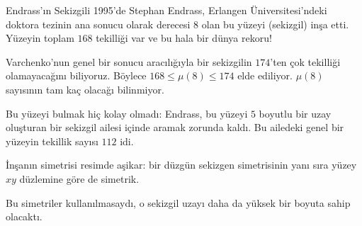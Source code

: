 \begin{surferPage}{Endrass'ın Sekizgili}
     1995'de Stephan Endrass,  Erlangen Üniversitesi'ndeki doktora tezinin ana sonucu olarak derecesi $8$ olan bu yüzeyi (sekizgil) inşa etti.
Yüzeyin toplam   $168$ tekilliği var ve bu hala bir dünya rekoru!

Varchenko'nun genel bir sonucu aracılığıyla  bir sekizgilin $174$'ten çok tekilliği olamayacağını biliyoruz. Böylece $168 \le \mu(8) \le 174$ elde ediliyor. $\mu(8)$ sayısının tam kaç olacağı bilinmiyor.

Bu yüzeyi bulmak hiç kolay olmadı: Endrass, bu yüzeyi  $5$ boyutlu bir uzay oluşturan bir sekizgil  ailesi içinde aramak zorunda kaldı. Bu ailedeki genel bir yüzeyin tekillik sayısı $112$ idi.

İnşanın simetrisi resimde aşikar: bir düzgün  sekizgen simetrisinin yanı sıra yüzey $xy$ düzlemine göre de simetrik.

Bu simetriler kullanılmasaydı, o sekizgil uzayı daha da yüksek bir boyuta sahip olacaktı.
\end{surferPage}
